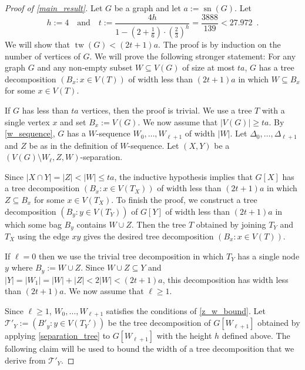 \documentclass{patmorin}
\newcommand{\pat}[1]{\textcolor{Blue}{[Pat: #1]}}
\DeclareMathOperator{\sep}{sn}
\DeclareMathOperator{\tw}{tw}
\begin{document}
\begin{proof}[Proof of \cref{main_result}]
  Let $G$ be a graph and let $a:=\sep(G)$.  Let
  \[
    h:=4 \quad\text{and}\quad t:=\frac{4h}{1-(2+\tfrac{1}{6})\cdot(\tfrac{2}{3})^{h}} = \frac{3888}{139} < 27.972 \enspace .
  \]
  We will show that $\tw(G)< (2t+1)a$. The proof is by induction on the number of vertices of $G$. We will prove the following stronger statement: For any graph $G$ and any non-empty subset $W\subseteq V(G)$ of size at most $ta$, $G$ has a tree decomposition $(B_x:x\in V(T))$ of width less than $(2t+1)a$ in which $W\subseteq B_x$ for some $x\in V(T)$.

  If $G$ has less than $ta$ vertices, then the proof is trivial. We use a tree $T$ with a single vertex $x$ and set $B_x:=V(G)$.  We now assume that $|V(G)|\ge ta$. 
  By \cref{w_sequence}, $G$ has a $W$-sequence $W_0,\ldots,W_{\ell+1}$ of width $|W|$.   Let $\Delta_0,\ldots,\Delta_{\ell+1}$ and $Z$ be as in the definition of $W$-sequence.  Let $(X,Y)$ be a $(V(G)\setminus W_{\ell},Z,W)$-separation.

  Since $|X\cap Y|=|Z|<|W|\le ta$, the inductive hypothesis implies that $G[X]$ has a tree decomposition $(B_x:x\in V(T_X))$ of width less than $(2t+1)a$ in which $Z\subseteq B_x$ for some $x \in V(T_X)$. To finish the proof, we construct a tree decomposition $(B_y:y\in V(T_Y))$ of $G[Y]$ of width less than $(2t+1)a$ in which some bag $B_{y}$ contains $W\cup Z$.  Then the tree $T$ obtained by joining $T_Y$ and $T_X$ using the edge $x y$ gives the desired tree decomposition $(B_x:x\in V(T))$. 
  
  If $\ell=0$ then we use the trivial tree decomposition in which $T_Y$ has a single node $y$ where $B_{y}:=W\cup Z$.  Since $W\cup Z\subseteq Y$ and $|Y|=|W_1|=|W|+|Z|< 2|W|<(2t+1)a$, this decomposition has width less than $(2t+1)a$. We now assume that $\ell \ge  1$.



  Since $\ell \ge 1$, $W_0,\ldots,W_{\ell+1}$ satisfies the conditions of \cref{z_w_bound}.
  Let $\mathcal{T}'_Y:=(B'_y:y\in V(T_Y'))$ be the tree decomposition of $G[W_{\ell+1}]$ obtained by applying \cref{separation_tree} to $G[W_{\ell+1}]$ with the height $h$ defined above.  The following claim will be used to bound the width of a tree decomposition that we derive from $\mathcal{T}'_Y$.


\end{proof}
\end{document}
